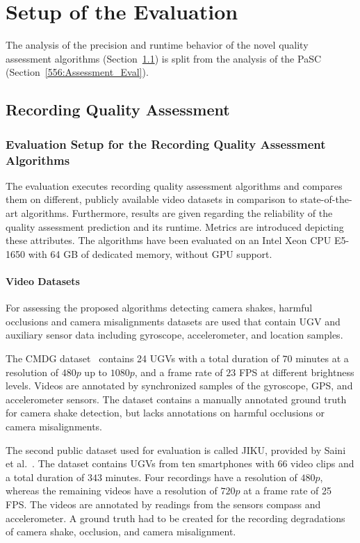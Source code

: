 \section{Setup of the Evaluation}
\label{sec:556_recording_intro}
The analysis of the precision and runtime behavior of the novel quality assessment algorithms (Section~\ref{sec:556_RQA_Eval}) is split from the analysis of the \ac{PaSC} (Section~\ref{556:Assessment_Eval}).
\subsection{Recording Quality Assessment}
\label{sec:556_RQA_Eval}
\subsubsection{Evaluation Setup for the Recording Quality Assessment Algorithms}
The evaluation executes recording quality assessment algorithms and compares them on different, publicly available video datasets in comparison to state-of-the-art algorithms.
Furthermore, results are given regarding the reliability of the quality assessment prediction and its runtime.
Metrics are introduced depicting these attributes.
The algorithms have been evaluated on an Intel Xeon CPU E5-1650 with 64 GB of dedicated memory, without \ac{GPU} support.
\paragraph{Video Datasets}
\label{sec:556_eva_dataset}
For assessing the proposed algorithms detecting camera shakes, harmful occlusions and camera misalignments datasets are used that contain \ac{UGV} and auxiliary sensor data including gyroscope, accelerometer, and location samples.

The CMDG dataset~\cite{Bano2015} contains 24 \ac{UGV}s with a total duration of $70$ minutes at a resolution of $480p$ up to $1080p$, and a frame rate of $23$ \ac{FPS} at different brightness levels.  
Videos are annotated by synchronized samples of the gyroscope, \ac{GPS}, and accelerometer sensors.
The dataset contains a manually annotated ground truth for camera shake detection, but lacks annotations on harmful occlusions or camera misalignments.
  
The second public dataset used for evaluation is called JIKU, provided by Saini et al.~\cite{Saini2012}.
The dataset contains \ac{UGV}s from ten smartphones with 66 video clips and a total duration of $343$ minutes.
Four recordings have a resolution of $480p$, whereas the remaining videos have a resolution of $720p$ at a frame rate of 25 \ac{FPS}. 
The videos are annotated by readings from the sensors compass and accelerometer.  
A ground truth had to be created for the recording degradations of camera shake, occlusion, and camera misalignment.

